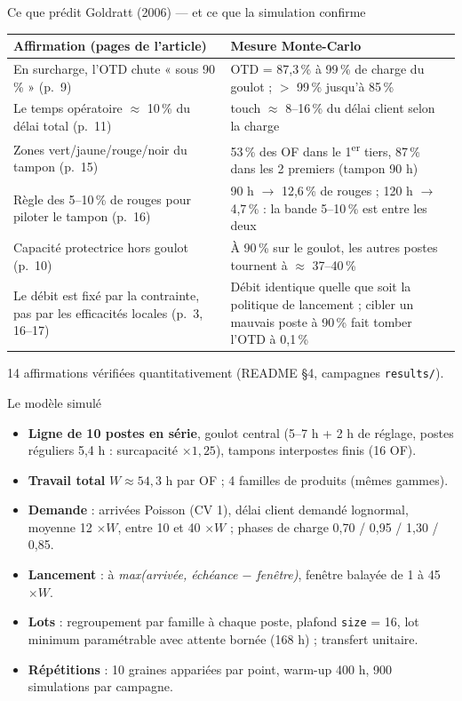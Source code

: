 \documentclass[10pt,aspectratio=169]{beamer}
\begin{document}
\begin{frame}{Ce que prédit Goldratt (2006) --- et ce que la simulation confirme}
\small
\begin{tabular}{@{}p{5.6cm}p{6.2cm}@{}}
\toprule
Affirmation (pages de l'article) & Mesure Monte-Carlo \\
\midrule
En surcharge, l'OTD chute « sous 90\,\% » (p.~9) & OTD = 87,3\,\% à 99\,\% de charge du goulot ; $>$ 99\,\% jusqu'à 85\,\% \\
Le temps opératoire $\approx$ 10\,\% du délai total (p.~11) & touch $\approx$ 8--16\,\% du délai client selon la charge \\
Zones vert/jaune/rouge/noir du tampon (p.~15) & 53\,\% des OF dans le 1\textsuperscript{er} tiers, 87\,\% dans les 2 premiers (tampon 90 h) \\
Règle des 5--10\,\% de rouges pour piloter le tampon (p.~16) & 90 h $\rightarrow$ 12,6\,\% de rouges ; 120 h $\rightarrow$ 4,7\,\% : la bande 5--10\,\% est entre les deux \\
Capacité protectrice hors goulot (p.~10) & À 90\,\% sur le goulot, les autres postes tournent à $\approx$ 37--40\,\% \\
Le débit est fixé par la contrainte, pas par les efficacités locales (p.~3, 16--17) & Débit identique quelle que soit la politique de lancement ; cibler un mauvais poste à 90\,\% fait tomber l'OTD à 0,1\,\% \\
\bottomrule
\end{tabular}
\vspace{2pt}
\footnotesize 14 affirmations vérifiées quantitativement (README \S 4, campagnes \texttt{results/}).
\end{frame}

\begin{frame}{Le modèle simulé}
\begin{itemize}
  \item \textbf{Ligne de 10 postes en série}, goulot central (5--7 h + 2 h de réglage,
        postes réguliers 5,4 h : surcapacité $\times 1{,}25$), tampons interpostes finis (16 OF).
  \item \textbf{Travail total} $W \approx 54{,}3$ h par OF ; 4 familles de produits (mêmes gammes).
  \item \textbf{Demande} : arrivées Poisson (CV 1), délai client demandé lognormal, moyenne 12 $\times W$,
        entre 10 et 40 $\times W$ ; phases de charge 0,70 / 0,95 / 1,30 / 0,85.
  \item \textbf{Lancement} : à \emph{max(arrivée, échéance $-$ fenêtre)}, fenêtre balayée de 1 à 45 $\times W$.
  \item \textbf{Lots} : regroupement par famille à chaque poste, plafond \texttt{size} = 16,
        lot minimum paramétrable avec attente bornée (168 h) ; transfert unitaire.
  \item \textbf{Répétitions} : 10 graines appariées par point, warm-up 400 h,
        900 simulations par campagne.
\end{itemize}
\end{frame}
\end{document}
